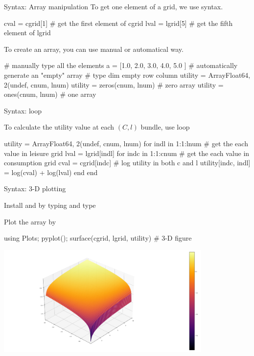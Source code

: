 \documentclass[11pt,aspectratio=43,usenames,dvipsnames]{beamer}
\theoremstyle{definition}
\begin{document}
\begin{frame}[fragile]{Syntax: Array manipulation}
\label{slide:Syntax__Array_manipulation}
To get one element of a grid, we use \juliainline{[]} syntax.
\begin{juliacode}
    cval = cgrid[1] # get the first element of cgrid
    lval = lgrid[5] # get the fifth element of lgrid
\end{juliacode}
To create an array, you can use manual or automatical way.
\begin{juliacode}
    # manually type all the elements
    a = [1.0, 2.0, 3.0, 4.0, 5.0 ]
    # automatically generate an "empty" array
    #               type    dim empty  row   column
    utility = Array{Float64, 2}(undef, cnum, lnum)
    utility = zeros(cnum, lnum) # zero array
    utility = ones(cnum, lnum) # one array
\end{juliacode}

\end{frame}


\begin{frame}[fragile]{Syntax:  loop}
\label{slide:Syntax___mintinline_julia__for__loop}

To calculate the utility value at each $ (C, l) $ bundle, use  loop

\begin{juliacode}
    utility = Array{Float64, 2}(undef, cnum, lnum)
    for indl in 1:1:lnum
        # get the each value in leisure grid
        lval = lgrid[indl]
        for indc in 1:1:cnum
            # get the each value in consumption grid
            cval = cgrid[indc]
            # log utility in both c and l
            utility[indc, indl] = log(cval) + log(lval)
        end
    end
\end{juliacode}

\end{frame}

\begin{frame}[fragile]{Syntax: 3-D plotting}
\label{slide:Syntax__3_D_plotting}

Install  and  by typing \juliainline{]} and type 

Plot the  array by

\begin{juliacode}
    using Plots; pyplot();
    surface(cgrid, lgrid, utility)  # 3-D figure
\end{juliacode}

\includegraphics[width=0.8\textwidth]{./figures/utility.png}
\end{frame}
\end{document}
